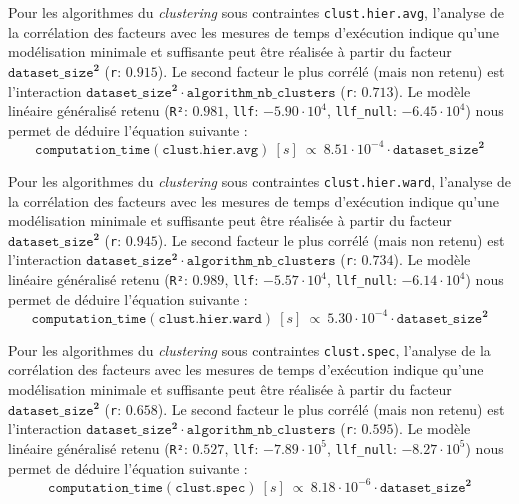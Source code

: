 			Pour les algorithmes du \textit{clustering} sous contraintes \texttt{clust.hier.avg}, l'analyse de la corrélation des facteurs avec les mesures de temps d'exécution indique qu'une modélisation minimale et suffisante peut être réalisée à partir du facteur $\texttt{dataset\_size}^{\textbf{2}}$ (\texttt{r}: $0.915$).
			Le second facteur le plus corrélé (mais non retenu) est l'interaction $\texttt{dataset\_size}^{\textbf{2}} \cdot \texttt{algorithm\_nb\_clusters}$ (\texttt{r}: $0.713$).
			Le modèle linéaire généralisé retenu (\texttt{R²}: $0.981$, \texttt{llf}: $-5.90 \cdot 10^{4}$, \texttt{llf\_null}: $-6.45 \cdot 10^{4}$) nous permet de déduire l'équation suivante :
			\begin{equation}
				\texttt{computation\_time}(\texttt{clust.hier.avg})~[s]~
				\propto~8.51 \cdot 10^{-4} \cdot \texttt{dataset\_size}^{\textbf{2}}
			\end{equation}

			Pour les algorithmes du \textit{clustering} sous contraintes \texttt{clust.hier.ward}, l'analyse de la corrélation des facteurs avec les mesures de temps d'exécution indique qu'une modélisation minimale et suffisante peut être réalisée à partir du facteur $\texttt{dataset\_size}^{\textbf{2}}$ (\texttt{r}: $0.945$).
			Le second facteur le plus corrélé (mais non retenu) est l'interaction $\texttt{dataset\_size}^{\textbf{2}} \cdot \texttt{algorithm\_nb\_clusters}$ (\texttt{r}: $0.734$).
			Le modèle linéaire généralisé retenu (\texttt{R²}: $0.989$, \texttt{llf}: $-5.57 \cdot 10^{4}$, \texttt{llf\_null}: $-6.14 \cdot 10^{4}$) nous permet de déduire l'équation suivante :
			\begin{equation}
				\texttt{computation\_time}(\texttt{clust.hier.ward})~[s]~
				\propto~5.30 \cdot 10^{-4} \cdot \texttt{dataset\_size}^{\textbf{2}}
			\end{equation}
			
			Pour les algorithmes du \textit{clustering} sous contraintes \texttt{clust.spec}, l'analyse de la corrélation des facteurs avec les mesures de temps d'exécution indique qu'une modélisation minimale et suffisante peut être réalisée à partir du facteur $\texttt{dataset\_size}^{\textbf{2}}$ (\texttt{r}: $0.658$).
			Le second facteur le plus corrélé (mais non retenu) est l'interaction $\texttt{dataset\_size}^{\textbf{2}} \cdot \texttt{algorithm\_nb\_clusters}$ (\texttt{r}: $0.595$).
			Le modèle linéaire généralisé retenu (\texttt{R²}: $0.527$, \texttt{llf}: $-7.89 \cdot 10^{5}$, \texttt{llf\_null}: $-8.27 \cdot 10^{5}$) nous permet de déduire l'équation suivante :
			\begin{equation}
				\texttt{computation\_time}(\texttt{clust.spec})~[s]~
				\propto~8.18 \cdot 10^{-6} \cdot \texttt{dataset\_size}^{\textbf{2}}
			\end{equation}
			

